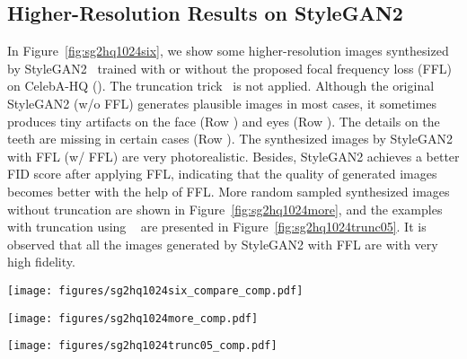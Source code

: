 \documentclass[10pt,twocolumn,letterpaper]{article}
\begin{document}
\subsection{Higher-Resolution Results on StyleGAN2}
\label{sec:moreexamples}

In Figure~\ref{fig:sg2hq1024six}, we show some higher-resolution images synthesized by StyleGAN2~\cite{stylegan2} trained with or without the proposed focal frequency loss (FFL) on CelebA-HQ (). The truncation trick~\cite{stylegan,stylegan2} is not applied.
Although the original StyleGAN2 (w/o FFL) generates plausible images in most cases, it sometimes produces tiny artifacts on the face (Row ) and eyes (Row ). The details on the teeth are missing in certain cases (Row ). The synthesized images by StyleGAN2 with FFL (w/ FFL) are very photorealistic. Besides, StyleGAN2 achieves a better FID score after applying FFL, indicating that the quality of generated images becomes better with the help of FFL.
More random sampled synthesized images without truncation are shown in Figure~\ref{fig:sg2hq1024more}, and the examples with truncation using ~\cite{stylegan,stylegan2} are presented in Figure~\ref{fig:sg2hq1024trunc05}. It is observed that all the images generated by StyleGAN2 with FFL are with very high fidelity.


\begin{figure*}[t]
	\centering
\texttt{[image: figures/sg2hq1024six\_compare\_comp.pdf]}
\caption{Synthesis results (without truncation) of StyleGAN2 trained with/without the proposed FFL on CelebA-HQ (). The model with FFL achieves the FID score of , outperforming the original StyleGAN2 without FFL of .}
	\label{fig:sg2hq1024six}
\end{figure*}


\begin{figure*}[t]
	\centering
\texttt{[image: figures/sg2hq1024more\_comp.pdf]}
\caption{More random sampled images (without truncation) synthesized by StyleGAN2 trained with the proposed FFL on CelebA-HQ ().}
	\label{fig:sg2hq1024more}
\end{figure*}


\begin{figure*}[t]
	\centering
\texttt{[image: figures/sg2hq1024trunc05\_comp.pdf]}
\caption{More random sampled images (with truncation applied using ~\cite{stylegan,stylegan2}) synthesized by StyleGAN2 trained with the proposed FFL on CelebA-HQ ().}
	\label{fig:sg2hq1024trunc05}
\end{figure*}
 
\end{document}
